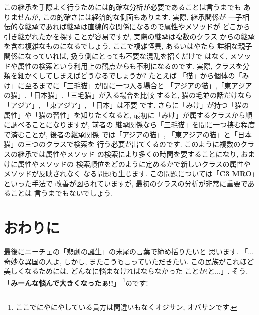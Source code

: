 この継承を手際よく行うためには的確な分析が必要であることは言うまでも
ありませんが, この的確さには経済的な側面もあります. 実際, 継承関係が
一子相伝的な継承であれば継承は直線的な関係になるので属性やメソッドが
どこから引き継がれたかを探すことが容易ですが, 実際の継承は複数のクラス
からの継承を含む複雑なものになるでしょう. ここで複雑怪異, あるいはやたら
詳細な親子関係になっていれば, 扱う側にとっても不要な混乱を招くだけで
はなく, メソッドや属性の検索という利用上の観点からも不利になるのです.
 実際, クラスを分類を細かくしてしまえばどうなるでしょうか?  たとえば
「猫」から個体の「みけ」に至るまでに「三毛猫」が間に一つ入る場合と
「アジアの猫」,「東アジアの猫」,「日本猫」,「三毛猫」が入る場合を比較
すると, 猫の毛並の話だけなら「アジア」, 「東アジア」, 「日本」は不要
です. さらに「みけ」が持つ「猫の属性」や「猫の習性」を知りたくなると,
 最初に「みけ」が属するクラスから順に調べることになりますが, 前者の
継承関係なら「三毛猫」を間に一つ挟む程度で済むことが, 後者の継承関係
では「アジアの猫」, 「東アジアの猫」と「日本猫」の三つのクラスで検索を
行う必要が出てくるのです. このように複数のクラスの継承では属性やメソッド
の検索により多くの時間を要することになり, おまけに属性やメソッドの
検索順位をどのように定めるかで新しいクラスの属性やメソッドが反映されなく
なる問題も生じます. この問題については「\textbf{C3 MRO}」といった手法で
改善が図られていますが, 最初のクラスの分析が非常に重要であることは
言うまでもないでしょう.

\section{おわりに}

最後にニーチェの「悲劇の誕生」\cite{悲劇の誕生}の末尾の言葉で締め括りたいと
思います. 「...奇妙な異国の人よ, しかし, またこうも言っていただきたい.
 この民族がこれほど美しくなるためには, どんなに悩まなければならなかった
ことか!と...」. そう, 「\textbf{みーんな悩んで大きくなったぁ!!}」
\cite{野坂}\footnote{ここでにやにやしている貴方は間違いもなくオジサン,
 オバサンです.}のです!


